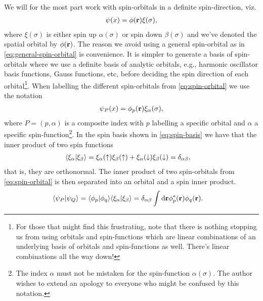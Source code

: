         We will for the most part work with spin-orbitals in a definite
        spin-direction, viz.
        \begin{align}
            \psi(x) = \phi(\mathbf{r})\xi(\sigma),
            \label{eq:spin-orbital}
        \end{align}
        where $\xi(\sigma)$ is either spin up $\alpha(\sigma)$ or spin down
        $\beta(\sigma)$ and we've denoted the spatial orbital by $\phi(\mathbf{r})$.
        The reason we avoid using a general spin-orbital as in
        \autoref{eq:general-spin-orbital} is convenience.
        It is simpler to generate a basis of spin-orbitals where we use a
        definite basis of analytic orbitals, e.g., harmonic oscillator basis
        functions, Gauss functions, etc, before deciding the spin direction of
        each orbital\footnote{
            For those that might find this frustrating, note that there is
            nothing stopping us from using orbitals and spin-functions which are
            linear combinations of an underlying basis of orbitals and
            spin-functions as well.
            There's linear combinations all the way down!
        }.
        When labelling the different spin-orbitals from
        \autoref{eq:spin-orbital} we use the notation
        \begin{align}
            \psi_P(x) = \phi_p(\mathbf{r})\xi_{\alpha}(\sigma),
        \end{align}
        where $P = (p, \alpha)$ is a composite index with $p$ labelling a
        specific orbital and $\alpha$ a specific spin-function\footnote{
            The index $\alpha$ must not be mistaken for the spin-function
            $\alpha(\sigma)$.
            The author wishes to extend an apology to everyone who might be
            confused by this notation.
        }.
        In the spin basis shown in \autoref{eq:spin-basis} we have that the
        inner product of two spin functions
        \begin{align}
            \langle \xi_{\alpha} | \xi_{\beta} \rangle
            &=
            \xi_{\alpha}(\uparrow)\xi_{\beta}(\uparrow)
            + \xi_{\alpha}(\downarrow)\xi_{\beta}(\downarrow)
            = \delta_{\alpha\beta},
        \end{align}
        that is, they are orthonormal.
        The inner product of two spin-orbitals from \autoref{eq:spin-orbital} is
        then separated into an orbital and a spin inner product.
        \begin{align}
            \langle \psi_P | \psi_Q \rangle
            &= \langle \phi_p | \phi_q \rangle\langle \xi_{\alpha} | \xi_{\beta} \rangle
            = \delta_{\alpha\beta}
            \int\mathrm{d}\mathbf{r}\phi^{*}_{p}(\mathbf{r})\phi_{q}(\mathbf{r}).
            \label{eq:inner-spin-orbital}
        \end{align}
